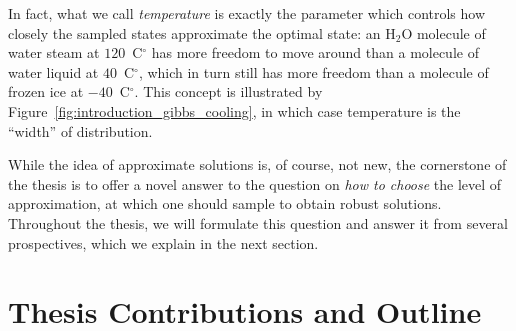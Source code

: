 In fact, what we call \textit{temperature} is exactly the parameter which
controls how closely the sampled states approximate the optimal state: an H$_2$O
molecule of water steam at $120$~C$^\circ$ has more freedom to move around than
a molecule of water liquid at $40$~C$^\circ$, which in turn still has more
freedom than a molecule of frozen ice at $-40$~C$^\circ$. This concept is
illustrated by Figure~\ref{fig:introduction_gibbs_cooling}, in which case
temperature is the ``width'' of distribution.

While the idea of approximate solutions is, of course, not new, the cornerstone of
the thesis is to offer a novel answer to the question on \textit{how to choose}
the level of approximation, at which one should sample to obtain robust
solutions. Throughout the thesis, we will formulate this question and answer it from
several prospectives, which we explain in the next section.

\section{Thesis Contributions and Outline}

